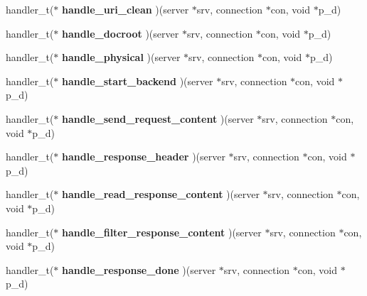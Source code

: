 \begin{CompactItemize}
\item 
\hypertarget{structplugin_fc26fff5d1ec7666608fda729b6a9a74}{
handler\_\-t($\ast$ \textbf{handle\_\-uri\_\-clean} )(server $\ast$srv, connection $\ast$con, void $\ast$p\_\-d)}
\label{structplugin_fc26fff5d1ec7666608fda729b6a9a74}

\item 
\hypertarget{structplugin_c6e9dddb37aca959bd90651e949d5f4d}{
handler\_\-t($\ast$ \textbf{handle\_\-docroot} )(server $\ast$srv, connection $\ast$con, void $\ast$p\_\-d)}
\label{structplugin_c6e9dddb37aca959bd90651e949d5f4d}

\item 
\hypertarget{structplugin_e5818db20f5d464df84a4c8bf4354567}{
handler\_\-t($\ast$ \textbf{handle\_\-physical} )(server $\ast$srv, connection $\ast$con, void $\ast$p\_\-d)}
\label{structplugin_e5818db20f5d464df84a4c8bf4354567}

\item 
\hypertarget{structplugin_79a8993bebdb2ee0cfba7824468a694a}{
handler\_\-t($\ast$ \textbf{handle\_\-start\_\-backend} )(server $\ast$srv, connection $\ast$con, void $\ast$p\_\-d)}
\label{structplugin_79a8993bebdb2ee0cfba7824468a694a}

\item 
\hypertarget{structplugin_348b93d40df354c42d54ac743a6d2732}{
handler\_\-t($\ast$ \textbf{handle\_\-send\_\-request\_\-content} )(server $\ast$srv, connection $\ast$con, void $\ast$p\_\-d)}
\label{structplugin_348b93d40df354c42d54ac743a6d2732}

\item 
\hypertarget{structplugin_2c8efcd277395f7d1dbd484125cf5942}{
handler\_\-t($\ast$ \textbf{handle\_\-response\_\-header} )(server $\ast$srv, connection $\ast$con, void $\ast$p\_\-d)}
\label{structplugin_2c8efcd277395f7d1dbd484125cf5942}

\item 
\hypertarget{structplugin_2589836637d6c1520e21e08e97bc07f9}{
handler\_\-t($\ast$ \textbf{handle\_\-read\_\-response\_\-content} )(server $\ast$srv, connection $\ast$con, void $\ast$p\_\-d)}
\label{structplugin_2589836637d6c1520e21e08e97bc07f9}

\item 
\hypertarget{structplugin_4453042dcbc5c68c290f1451c580a46b}{
handler\_\-t($\ast$ \textbf{handle\_\-filter\_\-response\_\-content} )(server $\ast$srv, connection $\ast$con, void $\ast$p\_\-d)}
\label{structplugin_4453042dcbc5c68c290f1451c580a46b}

\item 
\hypertarget{structplugin_d464d2af155e15bb1ee88e91de6ff891}{
handler\_\-t($\ast$ \textbf{handle\_\-response\_\-done} )(server $\ast$srv, connection $\ast$con, void $\ast$p\_\-d)}
\label{structplugin_d464d2af155e15bb1ee88e91de6ff891}


\end{CompactItemize}
